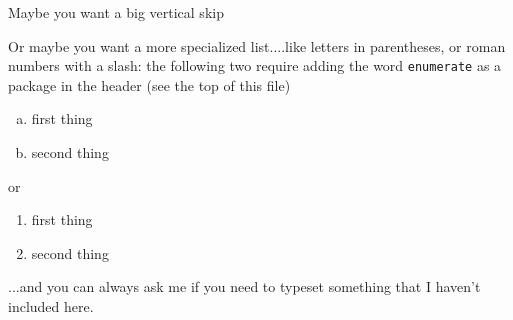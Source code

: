 \documentclass[12pt]{article}   %
\begin{document}
Maybe you want a big vertical skip

\vspace{1cm}

\noindent Or maybe you want a more specialized list....like letters in parentheses, or roman numbers with a slash: the following two require adding the word \texttt{enumerate} as a package  in the header (see the top of this file)

\begin{enumerate}[(a)]
\item first thing
\item second thing
\end{enumerate}

or

\begin{enumerate}[I/]
\item first thing
\item second thing
\end{enumerate}

\noindent ...and you can always ask me if you need to typeset something that I haven't
included here.
\end{document}
